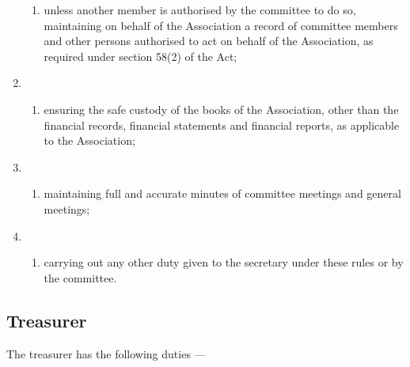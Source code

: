 \documentclass[../constitution.tex]{subfiles}
\begin{document}
\begin{enumerate}
\begin{enumerate}
  \item unless another member is authorised by the committee to do so, maintaining on behalf of the Association a record of committee members and other persons authorised to act on behalf of the Association, as required under section 58(2) of the Act;
  \end{enumerate}
\item \begin{enumerate}
  \def\labelenumi{\alph{enumi})}
  \setcounter{enumi}{6}
  
  \item ensuring the safe custody of the books of the Association, other than the financial records, financial statements and financial reports, as applicable to the Association;
  \end{enumerate}
\item \begin{enumerate}
  \def\labelenumi{\alph{enumi})}
  \setcounter{enumi}{7}
  
  \item maintaining full and accurate minutes of committee meetings and general meetings;
  \end{enumerate}
\item \begin{enumerate}
  \def\labelenumi{\roman{enumi})}
  
  \item carrying out any other duty given to the secretary under these rules or by the committee.
  \end{enumerate}
\end{enumerate}

\hypertarget{treasurer}{%
\subsection{Treasurer}\label{treasurer}}

The treasurer has the following duties ---
\end{document}
